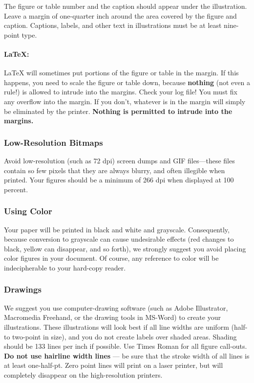 \documentclass[twoside,11pt]{article}
\begin{document}
The figure or table number and the caption should appear under the illustration. Leave a margin of one-quarter inch around the area covered by the figure and caption. Captions, labels, and other text in illustrations must be at least nine-point type. 

\paragraph{\LaTeX{}:} \LaTeX{} will sometimes put portions of the figure or table in the margin. If this happens, you need to scale the figure or table down, because {\bf nothing} (not even a rule!) is allowed to intrude into the margins. Check your log file! You must fix any overflow into the margin. If you don't, whatever is in the margin will simply be eliminated by the printer. {\bf Nothing is permitted to intrude into the margins.}

\subsubsection{Low-Resolution Bitmaps}
Avoid low-resolution (such as 72 dpi) screen dumps and GIF files---these files contain so few pixels that they are always blurry, and often illegible when 
printed. Your figures should be a minimum of 266 dpi when displayed at 100 percent.

\subsubsection{Using Color}
Your paper will be printed in black and white and grayscale. Consequently, because conversion to grayscale can cause undesirable effects (red changes to black, yellow can disappear, and so forth), we strongly suggest you avoid placing color figures in your document. Of course, any reference to color will be indecipherable to your hard-copy reader. 

\subsubsection{Drawings}
We suggest you use computer-drawing software (such as Adobe Illustrator, Macromedia Freehand, or the drawing tools in MS-Word) to create your illustrations. These illustrations will look best if all line widths are uniform (half- to two-point in size), and you do not create labels over shaded areas. Shading should be 133 lines per inch if possible. Use Times Roman for all figure call-outs. {\bf Do not use hairline width lines} --- be sure that the stroke width of all lines is at least one-half-pt. Zero point lines will print on a laser printer, but will completely disappear on the high-resolution printers.
\end{document}
